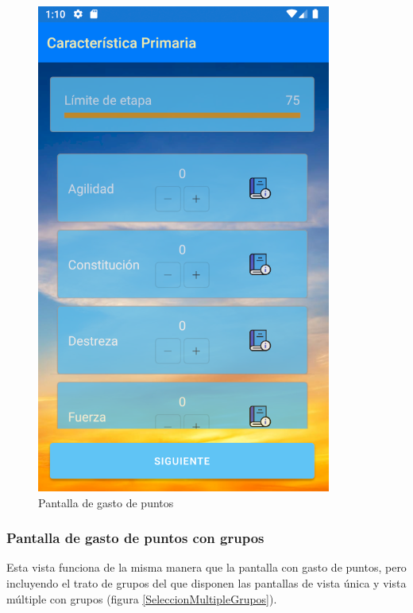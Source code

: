 \begin{figure}[H]
    \centering
    \includegraphics[scale=0.3]{Figures/Capturas/GastoPuntos.png}
    \caption{Pantalla de gasto de puntos}
    \label{GastoPuntos}    
\end{figure}

\subsubsection{Pantalla de gasto de puntos con grupos}
Esta vista funciona de la misma manera que la pantalla con gasto de puntos, pero incluyendo el trato de grupos del 
que disponen las pantallas de vista única y vista múltiple con grupos (figura \ref*{SeleccionMultipleGrupos}).

